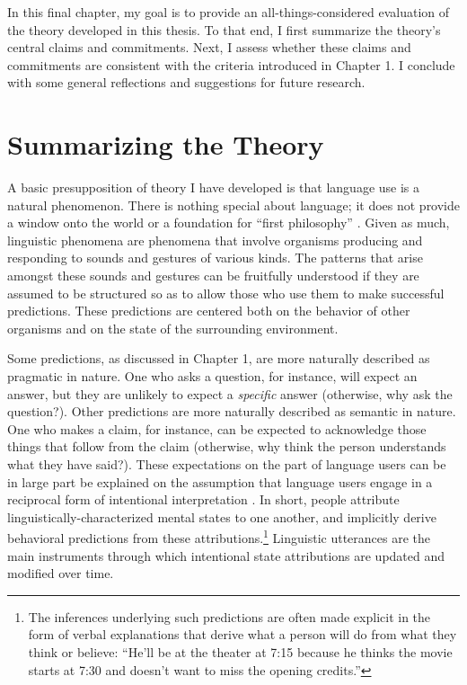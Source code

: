 In this final chapter, my goal is to provide an all-things-considered evaluation of the theory developed in this thesis. To that end, I first summarize the theory's central claims and commitments. Next, I assess whether these claims and commitments are consistent with the criteria introduced in Chapter 1. I conclude with some general reflections and suggestions for future research.  

\section{Summarizing the Theory}

A basic presupposition of theory I have developed is that language use is a natural phenomenon. There is nothing special about language; it does not provide a window onto the world or a foundation for ``first philosophy'' \citep[see][]{Stanley:2008}. Given as much, linguistic phenomena are phenomena that involve organisms producing and responding to sounds and gestures of various kinds. The patterns that arise amongst these sounds and gestures can be fruitfully understood if they are assumed to be structured so as to allow those who use them to make successful predictions. These predictions are centered both on the behavior of other organisms and on the state of the surrounding environment. 

Some predictions, as discussed in Chapter 1, are more naturally described as pragmatic in nature. One who asks a question, for instance, will expect an answer, but they are unlikely to expect a \textit{specific} answer (otherwise, why ask the question?). Other predictions are more naturally described as semantic in nature. One who makes a claim, for instance, can be expected to acknowledge those things that follow from the claim (otherwise, why think the person understands what they have said?). These expectations on the part of language users can be in large part be explained on the assumption that language users engage in a reciprocal form of intentional interpretation \citep{Brandom:1994,Dennett:1987}. In short, people attribute linguistically-characterized mental states to one another, and implicitly derive behavioral predictions from these attributions.\footnote{The inferences underlying such predictions are often made explicit in the form of verbal explanations that derive what a person will do from what they think or believe: ``He'll be at the theater at 7:15 because he thinks the movie starts at 7:30 and doesn't want to miss the opening credits.''} Linguistic utterances are the main instruments through which intentional state attributions are updated and modified over time. 

